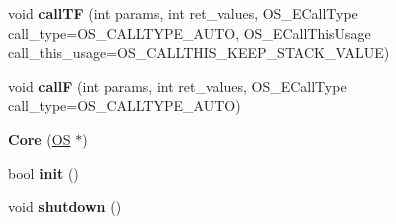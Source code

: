 \begin{DoxyCompactItemize}
\item 
void {\bfseries call\+TF} (int params, int ret\+\_\+values, O\+S\+\_\+\+E\+Call\+Type call\+\_\+type=O\+S\+\_\+\+C\+A\+L\+L\+T\+Y\+P\+E\+\_\+\+A\+U\+TO, O\+S\+\_\+\+E\+Call\+This\+Usage call\+\_\+this\+\_\+usage=O\+S\+\_\+\+C\+A\+L\+L\+T\+H\+I\+S\+\_\+\+K\+E\+E\+P\+\_\+\+S\+T\+A\+C\+K\+\_\+\+V\+A\+L\+UE)\hypertarget{class_object_script_1_1_o_s_1_1_core_a7b39cc39897bc4605302549bef9b7fbf}{}\label{class_object_script_1_1_o_s_1_1_core_a7b39cc39897bc4605302549bef9b7fbf}

\item 
void {\bfseries callF} (int params, int ret\+\_\+values, O\+S\+\_\+\+E\+Call\+Type call\+\_\+type=O\+S\+\_\+\+C\+A\+L\+L\+T\+Y\+P\+E\+\_\+\+A\+U\+TO)\hypertarget{class_object_script_1_1_o_s_1_1_core_a1b31a2b53ed91fa4136d1106270f7f69}{}\label{class_object_script_1_1_o_s_1_1_core_a1b31a2b53ed91fa4136d1106270f7f69}

\item 
{\bfseries Core} (\hyperlink{class_object_script_1_1_o_s}{OS} $\ast$)\hypertarget{class_object_script_1_1_o_s_1_1_core_aa1d8b67329c5bdc851f9f659b64c9e19}{}\label{class_object_script_1_1_o_s_1_1_core_aa1d8b67329c5bdc851f9f659b64c9e19}

\item 
bool {\bfseries init} ()\hypertarget{class_object_script_1_1_o_s_1_1_core_aee295a7e03a1d6fb72e425346b727ec2}{}\label{class_object_script_1_1_o_s_1_1_core_aee295a7e03a1d6fb72e425346b727ec2}

\item 
void {\bfseries shutdown} ()\hypertarget{class_object_script_1_1_o_s_1_1_core_a71fb122429cbfbe349bc9db37a5ef35f}{}\label{class_object_script_1_1_o_s_1_1_core_a71fb122429cbfbe349bc9db37a5ef35f}

\end{DoxyCompactItemize}
